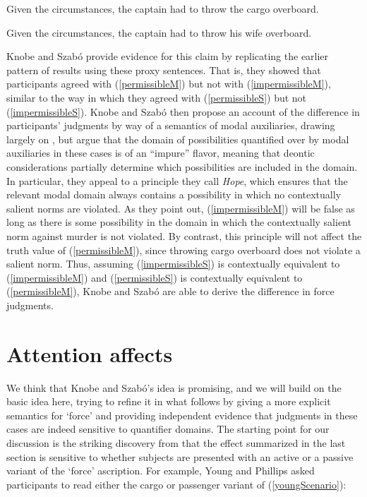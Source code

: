 \documentclass{salt}
\newcommand{\reff}[1]{(\ref{#1})}
\begin{document}
\begin{exe}\ex \label{permissibleM} %
Given the circumstances, the captain had to throw the cargo overboard.\end{exe}

\begin{exe}\ex \label{impermissibleM} %
Given the circumstances, the captain had to throw his wife overboard.\end{exe}

\noindent Knobe and Szab\'o provide evidence for this claim by replicating the earlier pattern of results using these proxy sentences. That is, they showed that participants agreed with \reff{permissibleM} but not with \reff{impermissibleM}, similar to the way in which they agreed with \reff{permissibleS} but not \reff{impermissibleS}. Knobe and Szab{\'o} then propose an account of the difference in participants' judgments by way of a semantics of modal auxiliaries, drawing largely on \citealt{Kratzer1977,Kratzer:1981}, but argue that the domain of possibilities quantified over by  modal auxiliaries in these cases is of an ``impure'' flavor, meaning that deontic considerations partially determine which possibilities are included in the domain. In particular, they appeal to a principle they call \emph{Hope}, which ensures that the relevant modal domain always contains a possibility in which no contextually salient norms are violated. As they point out, \reff{impermissibleM} will be false as long as there is some possibility in the domain in which the contextually salient norm against murder is not violated. By contrast, this principle will not affect the truth value of \reff{permissibleM}, since throwing cargo overboard does not violate a salient norm. Thus, assuming \reff{impermissibleS} is contextually equivalent to \reff{impermissibleM} and \reff{permissibleS} is contextually equivalent to \reff{permissibleM},  Knobe and Szab\'o  are able to derive the difference in force judgments.

\section{Attention affects} \label{sec:part1}

We think that Knobe and Szab\'o's idea is promising, and we will build on the basic idea here, trying to refine it in what follows by giving a more explicit semantics for `force' and providing independent evidence that judgments in these cases are indeed sensitive to quantifier domains. The starting point for our discussion is the striking discovery from \citealt{young2011paradox} that the effect summarized in the last section is sensitive to whether subjects are presented with an active or a passive variant of the `force' ascription. For example, Young and Phillips asked participants to read either the cargo or passenger variant of \reff{youngScenario}:
\end{document}
